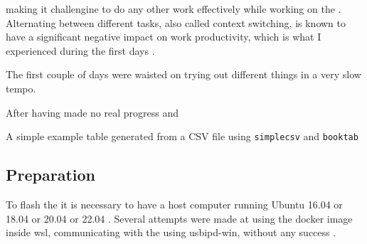 \pagebreak

making it challengine to do any other work effectively while working on the \cite{sadowskiEnablingPPSJetson2020}.
Alternating between different tasks, also called context switching, is known to have a significant negative impact on work productivity, which is what I experienced during the first days \cite[25-27]{meyerSoftwareDevelopersPerceptions2014}.

The first couple of days were waisted on trying out different things in a very slow tempo.

After having made no real progress and



\begin{table}[tbp]
    \centering
    \caption[A simple example table generated from a CSV file]{A simple example table generated from a CSV file using \texttt{simplecsv} and \texttt{booktab}}
    \label{tab:examplecsv}
\end{table}










\subsection{Preparation}
To flash the \jx it is necessary to have a host computer running Ubuntu 16.04 or 18.04 or 20.04 or 22.04 \cite{nvidiaSDKManager2019}.
Several attempts were made at using the docker image inside \gls{wsl}, communicating with the \jx using usbipd-win, without any success \cite{martensPortableSensorRig2022} \cite{nvidiaSDKManager2019} \cite{dorsselaerUsbipdwin2023}.


